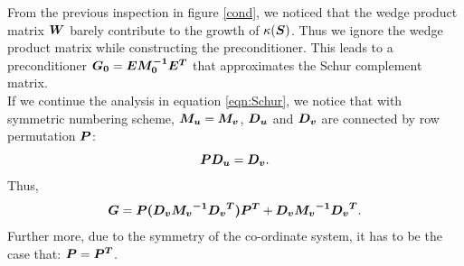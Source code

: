 From the previous inspection in figure \ref{cond}, we noticed that the wedge product matrix $\boldsymbol{W}$ barely contribute to the growth of $\kappa(\boldsymbol{S})$. Thus we ignore the wedge product matrix while constructing the preconditioner. This leads to a preconditioner $\boldsymbol{G_0} = \boldsymbol{E M_0^{-1} E^T}$ that approximates the Schur complement matrix. \\

If we continue the analysis in equation \ref{eqn:Schur}, we notice that with symmetric numbering scheme, $\boldsymbol{M_u} = \boldsymbol{M_v}$, $\boldsymbol{D_u}$ and $\boldsymbol{D_v}$ are connected by row permutation $\boldsymbol{P}$:
\begin{equation}
	\boldsymbol{PD_u} = \boldsymbol{D_v}.
\end{equation} 
Thus,
\begin{equation}
	\boldsymbol{G} = \boldsymbol{P (D_v {M_v}^{-1} {D_v}^T )P^T}  + \boldsymbol{D_v {M_v}^{-1} {D_v}^T} .
\end{equation}
Further more, due to the symmetry of the co-ordinate system, it has to be the case that: $\boldsymbol{P} = \boldsymbol{P^T}$. \\

